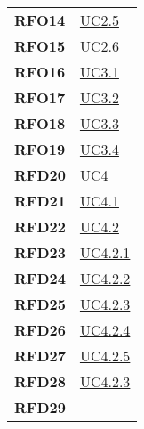 \begin{longtable}[H]{>{\centering\bfseries}m{8cm} >{\centering\arraybackslash}m{8cm}}
    RFO14
  
    &    \hyperref[ssub:uc2.5]{UC2.5}\\

    RFO15

    &   \hyperref[ssub:UC2.6]{UC2.6}\\

    RFO16
 
    &   \hyperref[ssub:uc3.1]{UC3.1} \\

    RFO17

    & \hyperref[sub:uc3.2]{UC3.2} \\

    RFO18

    &   \hyperref[sub:uc3.3]{UC3.3} \\

    RFO19
 
    &   \hyperref[ssub:uc3.4]{UC3.4} \\

    RFD20

    &  \hyperref[ssub:uc4]{UC4} \\

    RFD21

    &  \hyperref[ssub:uc4.1]{UC4.1} \\

    RFD22
   
    &  \hyperref[ssub:uc4.2]{UC4.2} \\

    RFD23
 
    &  \hyperref[ssub:uc4.2.1]{UC4.2.1} \\

    RFD24
 
    &  \hyperref[ssub:uc4.2.2]{UC4.2.2} \\

    RFD25
 
    &  \hyperref[ssub:uc4.2.3]{UC4.2.3} \\

    RFD26
    &  \hyperref[ssub:uc4.2.4]{UC4.2.4} \\

    RFD27
  
    &  \hyperref[ssub:uc4.2.5]{UC4.2.5} \\

    RFD28
  
    &  \hyperref[ssub:uc4.2.3]{UC4.2.3} \\

    RFD29
   

\end{longtable}
